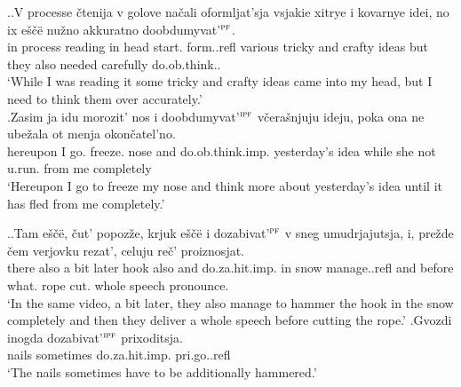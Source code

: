 \ex.\label{ex:doobdumyvat}\ag.V processe \v{c}tenija v golove na\v{c}ali oformljat'sja vsjakie xitrye i kovarnye idei, no ix e\v{s}\v{c}\"{e} nu\v{z}no akkuratno doobdumyvat'$^{\textsc{pf}}$.\\
in process reading in head start. form..refl various tricky and crafty ideas but they also needed carefully do.ob.think..\\
\trans `While I was reading it some tricky and crafty ideas came into my head, but I need to think them over accurately.'\\
\bg.Zasim ja idu morozit' nos i doobdumyvat'$^{\textsc{ipf}}$ v\v{c}era\v{s}njuju ideju, poka ona ne ube\v{z}ala ot menja okon\v{c}atel'no.\\
hereupon I go. freeze. nose and do.ob.think.imp. yesterday's idea while she not u.run. from me completely\\
\trans `Hereupon I go to freeze my nose and think more about yesterday's idea until it has fled from me completely.'


\ex.\label{ex:dozabivat}\ag.Tam e\v{s}\v{c}\"{e}, \v{c}ut' popoz\v{z}e, krjuk e\v{s}\v{c}\"{e} i dozabivat'$^{\textsc{pf}}$ v sneg umudrjajutsja, i, pre\v{z}de \v{c}em verjovku rezat', celuju re\v{c}' proiznosjat.\\
there also {a bit} later hook also and do.za.hit.imp. in snow manage..refl and before what. rope cut. whole speech pronounce.\\
\trans `In the same video, a bit later, they also manage to hammer the hook in the snow completely and then they deliver a whole speech before cutting the rope.'
\bg.Gvozdi inogda dozabivat'$^{\textsc{ipf}}$ prixoditsja.\\
nails sometimes do.za.hit.imp. pri.go..refl\\
\trans `The nails sometimes have to be additionally hammered.'\\


